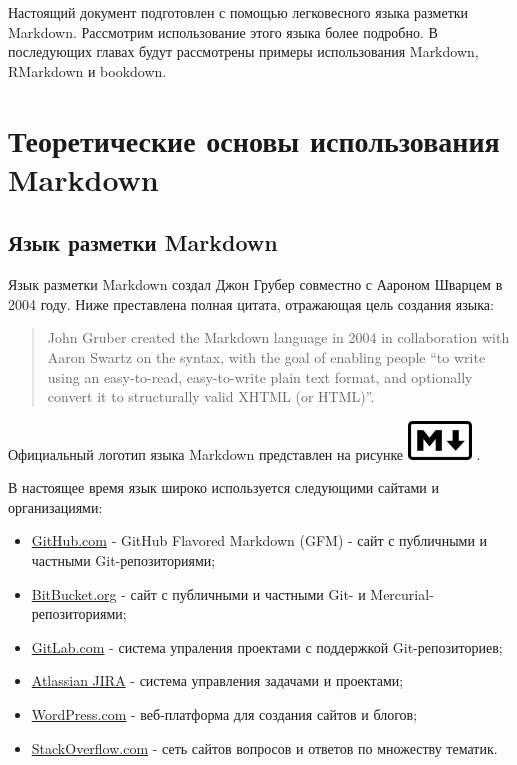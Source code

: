 \documentclass[
  a4paper,
]{book}
\providecommand{\tightlist}{%
  \setlength{\itemsep}{0pt}\setlength{\parskip}{0pt}}
\theoremstyle{definition}
\theoremstyle{definition}
\theoremstyle{definition}
\theoremstyle{definition}
\theoremstyle{remark}
\begin{document}
Настоящий документ подготовлен с помощью легковесного языка разметки Markdown. Рассмотрим использование этого языка более подробно. В последующих главах будут рассмотрены примеры использования Markdown, RMarkdown и bookdown.

\hypertarget{theory}{%
\chapter{Теоретические основы использования Markdown}\label{theory}}

\hypertarget{markdown-hist}{%
\section{Язык разметки Markdown}\label{markdown-hist}}

Язык разметки Markdown создал Джон Грубер совместно с Аароном Шварцем в 2004 году. Ниже преставлена полная цитата, отражающая цель создания языка:

\begin{quote}
John Gruber created the Markdown language in 2004 in collaboration with Aaron Swartz on the syntax, with the goal of enabling people ``to write using an easy-to-read, easy-to-write plain text format, and optionally convert it to structurally valid XHTML (or HTML)''.
\end{quote}

Официальный логотип языка Markdown представлен на рисунке \includegraphics{figures/Markdown-mark.png} .

В настоящее время язык широко используется следующими сайтами и организациями:

\begin{itemize}
\tightlist
\item
  \href{http://github.com}{GitHub.com} - GitHub Flavored Markdown (GFM) - сайт с публичными и частными Git-репозиториями;
\item
  \href{https://bitbucket.org}{BitBucket.org} - сайт с публичными и частными Git- и Mercurial- репозиториями;
\item
  \href{https://about.gitlab.com/}{GitLab.com} - система упраления проектами с поддержкой Git-репозиториев;
\item
  \href{https://www.atlassian.com/software/jira}{Atlassian JIRA} - система управления задачами и проектами;
\item
  \href{https://wordpress.com/}{WordPress.com} - веб-платформа для создания сайтов и блогов;
\item
  \href{https://stackoverflow.com/}{StackOverflow.com} - сеть сайтов вопросов и ответов по множеству тематик.
\end{itemize}
\end{document}
